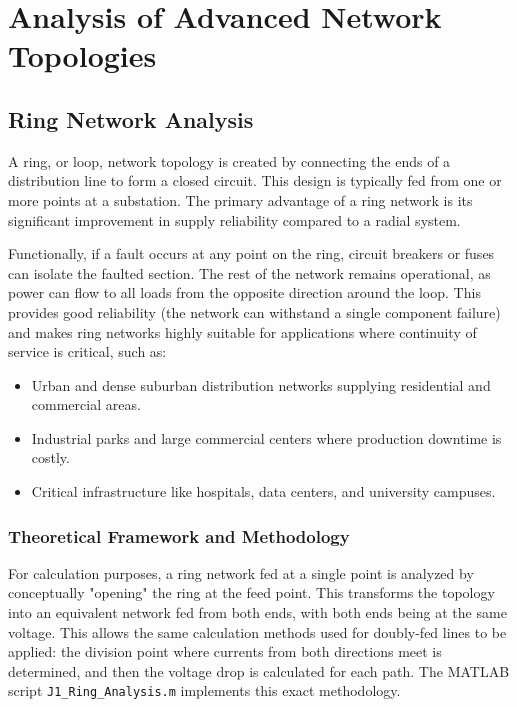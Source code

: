\documentclass[12pt, a4paper]{article}
\begin{document}
\section{Analysis of Advanced Network Topologies}
\subsection{Ring Network Analysis}
A ring, or loop, network topology is created by connecting the ends of a distribution line to form a closed circuit. This design is typically fed from one or more points at a substation. The primary advantage of a ring network is its significant improvement in supply reliability compared to a radial system.

Functionally, if a fault occurs at any point on the ring, circuit breakers or fuses can isolate the faulted section. The rest of the network remains operational, as power can flow to all loads from the opposite direction around the loop. This provides good reliability (the network can withstand a single component failure) and makes ring networks highly suitable for applications where continuity of service is critical, such as:
\begin{itemize}
    \item Urban and dense suburban distribution networks supplying residential and commercial areas.
    \item Industrial parks and large commercial centers where production downtime is costly.
    \item Critical infrastructure like hospitals, data centers, and university campuses.
\end{itemize}

\subsubsection{Theoretical Framework and Methodology}
For calculation purposes, a ring network fed at a single point is analyzed by conceptually "opening" the ring at the feed point. This transforms the topology into an equivalent network fed from both ends, with both ends being at the same voltage. This allows the same calculation methods used for doubly-fed lines to be applied: the division point where currents from both directions meet is determined, and then the voltage drop is calculated for each path. The MATLAB script \texttt{J1\_Ring\_Analysis.m} implements this exact methodology.
\end{document}
